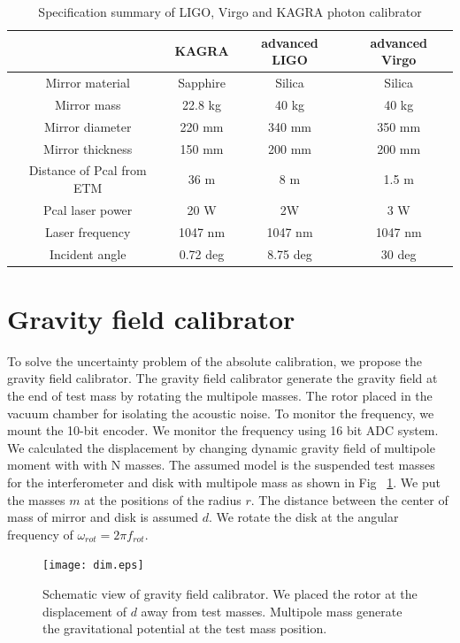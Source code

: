 \documentclass[]{spie}  %
\begin{document}
\begin{table}
\begin{center}
\caption{Specification summary of LIGO, Virgo and KAGRA photon calibrator\label{pcal}}
\footnotesize
\begin{tabular}{cccc}
\hline
& KAGRA& advanced LIGO& advanced Virgo \\
\hline
Mirror material & Sapphire & Silica & Silica \\
 Mirror mass & 22.8 kg & 40 kg & 40 kg \\
  Mirror diameter & 220 mm & 340 mm & 350 mm \\
    Mirror thickness & 150 mm & 200 mm & 200 mm \\
 Distance of Pcal from ETM & 36 m & 8 m & 1.5 m \\
  Pcal laser power & 20 W & 2W & 3 W \\
  Laser frequency & 1047 nm & 1047 nm &1047 nm\\
  Incident angle& 0.72 deg & 8.75 deg &30 deg \\
  \hline
\end{tabular}
\end{center}
\end{table}

\section{Gravity field calibrator} \label{sec:Gcal}
To solve the uncertainty problem of the absolute calibration, we propose the gravity field calibrator. The gravity field calibrator generate the gravity field at the end of test mass by rotating the multipole masses. The rotor placed in the vacuum chamber for isolating the acoustic noise. To monitor the frequency, we mount the 10-bit encoder. We monitor the frequency using 16 bit ADC system.
We calculated the displacement by changing dynamic gravity field of multipole moment with with N masses.
The assumed model is the suspended test masses for the interferometer and disk with multipole mass as shown in Fig ~\ref{fig:dim}.
We put the masses $m$ at the positions of the radius $r$. The distance between the center of mass of mirror and disk is assumed $d$.
We rotate the disk at the angular frequency of $\omega_{rot}=2\pi f_{rot}$.

\begin{figure}
\begin{center}
\texttt{[image: dim.eps]}
\caption{Schematic view of gravity field calibrator. We placed the rotor at the displacement of $d$ away from test masses. Multipole mass generate the gravitational potential at the test mass position.}
\label{fig:dim}
\end{center}
\end{figure}
\end{document}
